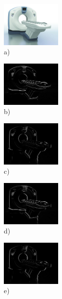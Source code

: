 \documentclass{thesis}%
\begin{document}
\begin{figure}[htp!]
   \begin{minipage}[c]{\textwidth}
	\centering\includegraphics[width=3cm]{ctmach.jpg}\\
     a)
   \end{minipage}
    \begin{minipage}[c]{0.3\textwidth}
	\centering\includegraphics[width=3cm]{convolution/Sobel1.jpg}\\
     b)
   \end{minipage}
    \begin{minipage}[c]{0.3\textwidth}
	\centering\includegraphics[width=3cm]{convolution/Sobel2.jpg}\\
     c)
   \end{minipage}
    \begin{minipage}[c]{0.3\textwidth}
	\centering\includegraphics[width=3cm]{convolution/Sobel3.jpg}\\
     d)
   \end{minipage}
    \begin{minipage}[c]{0.3\textwidth}
	\centering\includegraphics[width=3cm]{convolution/Prewitt1.jpg}\\
     e)
   \end{minipage}
    \begin{minipage}[c]{0.3\textwidth}

\end{minipage}
\end{figure}
\end{document}
